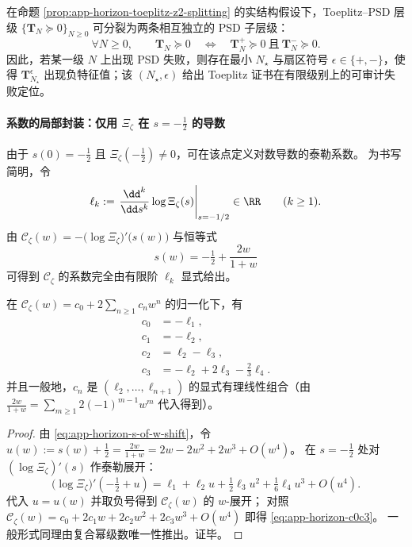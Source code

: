 \begin{corollary}\label{cor:app-horizon-toeplitz-z2-cert-split}
在命题 \ref{prop:app-horizon-toeplitz-z2-splitting} 的实结构假设下，Toeplitz--PSD 层级
\(\{\mathbf{T}_N\succeq 0\}_{N\ge 0}\)
可分裂为两条相互独立的 PSD 子层级：
\[
\forall N\ge 0,\qquad
\mathbf{T}_N\succeq 0
\quad\Longleftrightarrow\quad
\mathbf{T}_N^{+}\succeq 0\ \text{且}\ \mathbf{T}_N^{-}\succeq 0.
\]
因此，若某一级 \(N\) 上出现 PSD 失败，则存在最小 \(N_\star\) 与扇区符号 \(\epsilon\in\{+,-\}\)，使得 \(\mathbf{T}_{N_\star}^{\epsilon}\) 出现负特征值；该 \((N_\star,\epsilon)\) 给出 Toeplitz 证书在有限级别上的可审计失败定位。
\end{corollary}

\paragraph{系数的局部封装：仅用 \texorpdfstring{$\Xi_{\zeta}$}{Xi_zeta} 在 \texorpdfstring{$s=-\tfrac12$}{s=-1/2} 的导数}
由于 \(s(0)=-\tfrac12\) 且 \(\Xi_{\zeta}(-\tfrac12)\neq 0\)，可在该点定义对数导数的泰勒系数。
为书写简明，令
\[
\ell_k:=\left.\frac{\dd^k}{\dd s^k}\log\Xi_{\zeta}(s)\right|_{s=-1/2}\in\RR
\qquad(k\ge 1).
\]
由 \(\mathscr{C}_{\zeta}(w)=-\bigl(\log\Xi_{\zeta}\bigr)'\!\bigl(s(w)\bigr)\) 与恒等式
\begin{equation}\label{eq:app-horizon-s-of-w-shift}
s(w)=-\tfrac12+\frac{2w}{1+w}
\end{equation}
可得到 \(\mathscr{C}_{\zeta}\) 的系数完全由有限阶 \(\ell_k\) 显式给出。

\begin{proposition}[前几阶系数的显式表达]\label{prop:app-horizon-coeff-local}
在 \(\mathscr{C}_{\zeta}(w)=c_0+2\sum_{n\ge 1}c_n w^n\) 的归一化下，有
\begin{equation}\label{eq:app-horizon-c0c3}
\begin{aligned}
c_0&=-\ell_1,\\
c_1&=-\ell_2,\\
c_2&=\ell_2-\ell_3,\\
c_3&=-\ell_2+2\ell_3-\tfrac23\ell_4.
\end{aligned}
\end{equation}
并且一般地，\(c_n\) 是 \((\ell_2,\dots,\ell_{n+1})\) 的显式有理线性组合（由 \(\frac{2w}{1+w}=\sum_{m\ge 1}2(-1)^{m-1}w^m\) 代入得到）。
\end{proposition}

\begin{proof}
由 \eqref{eq:app-horizon-s-of-w-shift}，令 \(u(w):=s(w)+\tfrac12=\frac{2w}{1+w}=2w-2w^2+2w^3+O(w^4)\)。
在 \(s=-\tfrac12\) 处对 \( (\log\Xi_{\zeta})'(s) \) 作泰勒展开：
\[
\bigl(\log\Xi_{\zeta}\bigr)'\!\left(-\tfrac12+u\right)
=\ell_1+\ell_2 u+\tfrac12\ell_3 u^2+\tfrac16\ell_4 u^3+O(u^4).
\]
代入 \(u=u(w)\) 并取负号得到 \(\mathscr{C}_{\zeta}(w)\) 的 \(w\)-展开；
对照 \(\mathscr{C}_{\zeta}(w)=c_0+2c_1w+2c_2w^2+2c_3w^3+O(w^4)\) 即得 \eqref{eq:app-horizon-c0c3}。
一般形式同理由复合幂级数唯一性推出。证毕。
\end{proof}

